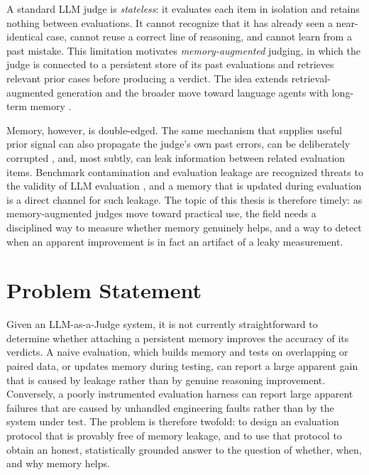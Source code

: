 \documentclass[14pt,a4paper]{extreport}
\begin{document}
A standard LLM judge is \emph{stateless}: it evaluates each item in isolation and retains nothing between evaluations. It cannot recognize that it has already seen a near-identical case, cannot reuse a correct line of reasoning, and cannot learn from a past mistake. This limitation motivates \emph{memory-augmented} judging, in which the judge is connected to a persistent store of its past evaluations and retrieves relevant prior cases before producing a verdict. The idea extends retrieval-augmented generation \cite{rag_original2020} and the broader move toward language agents with long-term memory \cite{memgpt2023, generative_agents2023, reflexion2023}.

Memory, however, is double-edged. The same mechanism that supplies useful prior signal can also propagate the judge's own past errors, can be deliberately corrupted \cite{rag_poisoning2024}, and, most subtly, can leak information between related evaluation items. Benchmark contamination and evaluation leakage are recognized threats to the validity of LLM evaluation \cite{data_contamination2024, benchmark_contamination2024, eval_leakage2024}, and a memory that is updated during evaluation is a direct channel for such leakage. The topic of this thesis is therefore timely: as memory-augmented judges move toward practical use, the field needs a disciplined way to measure whether memory genuinely helps, and a way to detect when an apparent improvement is in fact an artifact of a leaky measurement.

\section{Problem Statement}

Given an LLM-as-a-Judge system, it is not currently straightforward to determine whether attaching a persistent memory improves the accuracy of its verdicts. A naive evaluation, which builds memory and tests on overlapping or paired data, or updates memory during testing, can report a large apparent gain that is caused by leakage rather than by genuine reasoning improvement. Conversely, a poorly instrumented evaluation harness can report large apparent failures that are caused by unhandled engineering faults rather than by the system under test. The problem is therefore twofold: to design an evaluation protocol that is provably free of memory leakage, and to use that protocol to obtain an honest, statistically grounded answer to the question of whether, when, and why memory helps.
\end{document}

